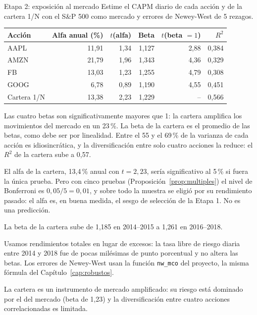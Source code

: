 \begin{ejresuelto}{Etapa 2: exposición al mercado}\label{ej:etapa2}
\enunciado Estime el CAPM diario de cada acción y de la cartera 1/N con el S\&P 500 como mercado y errores de Newey-West de 5 rezagos.

\solucion
{}
\begin{center}\small
\begin{tabular}{@{}lrrrrr@{}}
\toprule
Acción & Alfa anual (\%) & $t$(alfa) & Beta & $t$(beta $=1$) & $R^2$ \\
\midrule
AAPL & 11,91 & 1,34 & 1,127 & 2,88 & 0,384 \\
AMZN & 21,79 & 1,96 & 1,343 & 4,36 & 0,329 \\
FB & 13,03 & 1,23 & 1,255 & 4,79 & 0,308 \\
GOOG & 6,78 & 0,89 & 1,190 & 4,55 & 0,451 \\
Cartera 1/N & 13,38 & 2,23 & 1,229 & -- & 0,566 \\
\bottomrule
\end{tabular}
\end{center}
Las cuatro betas son significativamente mayores que 1: la cartera amplifica los movimientos del mercado en un 23\,\%. La beta de la cartera es el promedio
de las betas, como debe ser por linealidad. Entre el 55 y el 69\,\% de la varianza de cada acción es idiosincrática, y la diversificación entre solo cuatro
acciones la reduce: el $R^2$ de la cartera sube a 0,57.

 El alfa de la cartera, 13,4\,\% anual con $t=2{,}23$, sería significativo al 5\,\% si fuera la única prueba. Pero con cinco pruebas
(Proposición~\ref{prop:multiples}) el nivel de Bonferroni es $0{,}05/5=0{,}01$, y sobre todo la muestra se eligió por su rendimiento pasado: el alfa es,
en buena medida, el sesgo de selección de la Etapa 1. No es una predicción.

 La beta de la cartera sube de 1,185 en 2014--2015 a 1,261 en 2016--2018.


\RvsPy Usamos rendimientos totales en lugar de excesos: la tasa libre de riesgo diaria entre 2014 y 2018 fue de pocas milésimas de punto porcentual y no
altera las betas. Los errores de Newey-West usan la función \texttt{nw\_mco} del proyecto, la misma fórmula del Capítulo~\ref{cap:robustos}.

\begin{conclusion}
La cartera es un instrumento de mercado amplificado: su riesgo está dominado por el del mercado (beta de 1,23) y la diversificación entre cuatro acciones
correlacionadas es limitada.
\end{conclusion}
\end{ejresuelto}

